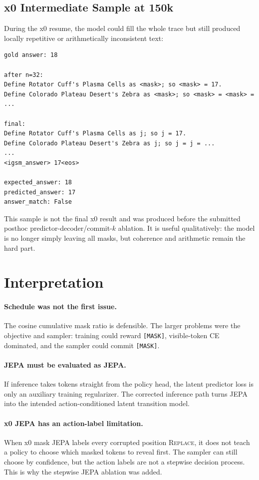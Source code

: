 \documentclass[11pt]{article}
\begin{document}
\subsection{x0 Intermediate Sample at 150k}

During the x0 resume, the model could fill the whole trace but still produced
locally repetitive or arithmetically inconsistent text:
\begin{lstlisting}
gold answer: 18

after n=32:
Define Rotator Cuff's Plasma Cells as <mask>; so <mask> = 17.
Define Colorado Plateau Desert's Zebra as <mask>; so <mask> = <mask> = ...

final:
Define Rotator Cuff's Plasma Cells as j; so j = 17.
Define Colorado Plateau Desert's Zebra as j; so j = j = ...
...
<igsm_answer> 17<eos>

expected_answer: 18
predicted_answer: 17
answer_match: False
\end{lstlisting}
This sample is not the final x0 result and was produced before the submitted
posthoc predictor-decoder/commit-$k$ ablation.  It is useful qualitatively: the
model is no longer simply leaving all masks, but coherence and arithmetic remain
the hard part.

\section{Interpretation}

\paragraph{Schedule was not the first issue.}
The cosine cumulative mask ratio is defensible.  The larger problems were the
objective and sampler: training could reward \texttt{[MASK]}, visible-token CE
dominated, and the sampler could commit \texttt{[MASK]}.

\paragraph{JEPA must be evaluated as JEPA.}
If inference takes tokens straight from the policy head, the latent predictor
loss is only an auxiliary training regularizer.  The corrected inference path
turns JEPA into the intended action-conditioned latent transition model.

\paragraph{x0 JEPA has an action-label limitation.}
When x0 mask JEPA labels every corrupted position \textsc{Replace}, it does not
teach a policy to choose which masked tokens to reveal first.  The sampler can
still choose by confidence, but the action labels are not a stepwise decision
process.  This is why the stepwise JEPA ablation was added.
\end{document}
